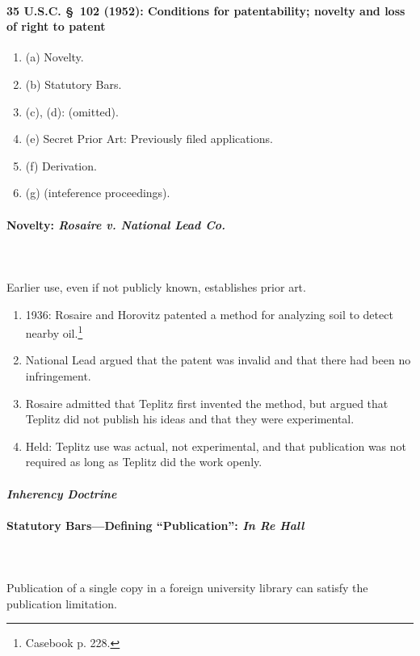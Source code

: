 \paragraph{35 U.S.C. \S\ 102 (1952): Conditions for patentability; novelty and 
loss of right to patent}

\begin{enumerate}
    \item (a) Novelty.
    \item (b) Statutory Bars.
    \item (c), (d): (omitted).
    \item (e) Secret Prior Art: Previously filed applications.
    \item (f) Derivation.
    \item (g) (inteference proceedings).
\end{enumerate}

\paragraph{Novelty: \emph{Rosaire v. National Lead Co.}}
~\\\\
Earlier use, even if not publicly known, establishes prior art.

\begin{enumerate}
    \item 1936: Rosaire and Horovitz patented a method for analyzing soil to 
    detect nearby oil.\footnote{Casebook p. 228.}
    \item National Lead argued that the patent was invalid and that there had 
    been no infringement.
    \item Rosaire admitted that Teplitz first invented the method, but argued 
    that Teplitz did not publish his ideas and that they were experimental.
    \item Held: Teplitz use was actual, not experimental, and that publication 
    was not required as long as Teplitz did the work openly.
\end{enumerate}

\paragraph{\emph{Inherency Doctrine}}


\paragraph{Statutory Bars---Defining ``Publication'': \emph{In Re Hall}}
~\\\\
Publication of a single copy in a foreign university library can satisfy 
the publication limitation.

